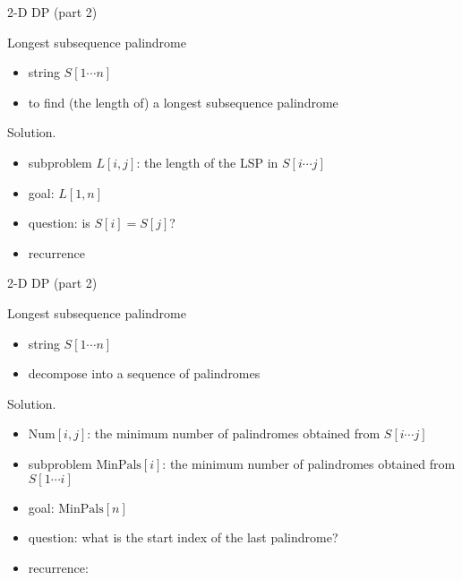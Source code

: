 \begin{frame}{2-D DP (part 2)}
  \begin{exampleblock}{Longest subsequence palindrome }
    \begin{itemize}
      \item string $S[1 \cdots n]$
      \item to find (the length of) a longest subsequence palindrome
    \end{itemize}
  \end{exampleblock}

  \begin{block}{Solution.}
    \begin{itemize}
      \item subproblem $L[i,j]$: the length of the LSP in $S[i \cdots j]$
      \item goal: $L[1,n]$
      \item question: is $S[i] = S[j]$?
      \item recurrence
    \end{itemize}
  \end{block}
\end{frame}
\begin{frame}{2-D DP (part 2)}
  \begin{exampleblock}{Longest subsequence palindrome }
    \begin{itemize}
      \item string $S[1 \cdots n]$
      \item decompose into a sequence of palindromes
    \end{itemize}
  \end{exampleblock}

  \begin{block}{Solution.}
    \begin{itemize}
      \item $\text{Num}[i,j]$: the minimum number of palindromes obtained from $S[i \cdots j]$
      \item subproblem $\text{MinPals}[i]$: the minimum number of palindromes obtained from $S[1 \cdots i]$
      \item goal: $\text{MinPals}[n]$
      \item question: what is the start index of the last palindrome?
      \item recurrence:
    \end{itemize}
  \end{block}
\end{frame}
